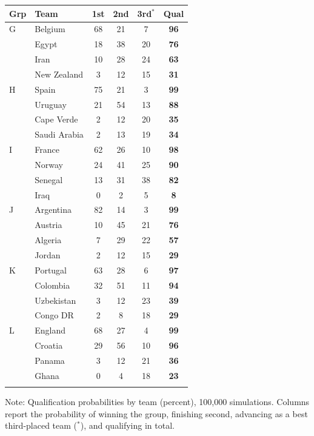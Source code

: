 \documentclass[11pt,letterpaper]{article}
\begin{document}
\begin{table}[htpb!]
\begin{threeparttable}
{\begin{minipage}{0.49\textwidth}
\end{minipage}\hfill
\begin{minipage}{0.49\textwidth}\centering
\begin{tabular}{llcccc}
\toprule
Grp & Team & 1st & 2nd & 3rd$^{*}$ & Qual \\
\midrule
G & Belgium & 68 & 21 & 7 & \textbf{96} \\
 & Egypt & 18 & 38 & 20 & \textbf{76} \\
 & Iran & 10 & 28 & 24 & \textbf{63} \\
 & New Zealand & 3 & 12 & 15 & \textbf{31} \\
\addlinespace
H & Spain & 75 & 21 & 3 & \textbf{99} \\
 & Uruguay & 21 & 54 & 13 & \textbf{88} \\
 & Cape Verde & 2 & 12 & 20 & \textbf{35} \\
 & Saudi Arabia & 2 & 13 & 19 & \textbf{34} \\
\addlinespace
I & France & 62 & 26 & 10 & \textbf{98} \\
 & Norway & 24 & 41 & 25 & \textbf{90} \\
 & Senegal & 13 & 31 & 38 & \textbf{82} \\
 & Iraq & 0 & 2 & 5 & \textbf{8} \\
\addlinespace
J & Argentina & 82 & 14 & 3 & \textbf{99} \\
 & Austria & 10 & 45 & 21 & \textbf{76} \\
 & Algeria & 7 & 29 & 22 & \textbf{57} \\
 & Jordan & 2 & 12 & 15 & \textbf{29} \\
\addlinespace
K & Portugal & 63 & 28 & 6 & \textbf{97} \\
 & Colombia & 32 & 51 & 11 & \textbf{94} \\
 & Uzbekistan & 3 & 12 & 23 & \textbf{39} \\
 & Congo DR & 2 & 8 & 18 & \textbf{29} \\
\addlinespace
L & England & 68 & 27 & 4 & \textbf{99} \\
 & Croatia & 29 & 56 & 10 & \textbf{96} \\
 & Panama & 3 & 12 & 21 & \textbf{36} \\
 & Ghana & 0 & 4 & 18 & \textbf{23} \\
\addlinespace
\bottomrule
\end{tabular}
\end{minipage}}
    \begin{tablenotes}\notesize
      \item Note: Qualification probabilities by team (percent), 100{,}000 simulations. Columns report the probability of winning the group, finishing second, advancing as a best third-placed team ($^{*}$), and qualifying in total.
    \end{tablenotes}
  \end{threeparttable}
\end{table}
\end{document}
